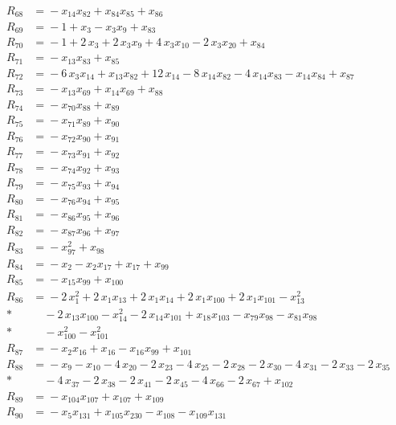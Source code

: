 \begin{align*}
R_{68} &={} -x_{14} x_{82} +x_{84} x_{85} +x_{86} \\[2pt]
R_{69} &={} -1 +x_{3} -x_{3} x_{9} +x_{83} \\[2pt]
R_{70} &={} -1 +2\,x_{3} +2\,x_{3} x_{9} +4\,x_{3} x_{10} -2\,x_{3} x_{20} +x_{84} \\[2pt]
R_{71} &={} -x_{13} x_{83} +x_{85} \\[2pt]
R_{72} &={} -6\,x_{3} x_{14} +x_{13} x_{82} +12\,x_{14} -8\,x_{14} x_{82} -4\,x_{14} x_{83} -x_{14} x_{84} +x_{87} \\[2pt]
R_{73} &={} -x_{13} x_{69} +x_{14} x_{69} +x_{88} \\[2pt]
R_{74} &={} -x_{70} x_{88} +x_{89} \\[2pt]
R_{75} &={} -x_{71} x_{89} +x_{90} \\[2pt]
R_{76} &={} -x_{72} x_{90} +x_{91} \\[2pt]
R_{77} &={} -x_{73} x_{91} +x_{92} \\[2pt]
R_{78} &={} -x_{74} x_{92} +x_{93} \\[2pt]
R_{79} &={} -x_{75} x_{93} +x_{94} \\[2pt]
R_{80} &={} -x_{76} x_{94} +x_{95} \\[2pt]
R_{81} &={} -x_{86} x_{95} +x_{96} \\[2pt]
R_{82} &={} -x_{87} x_{96} +x_{97} \\[2pt]
R_{83} &={} -x_{97}^{2} +x_{98} \\[2pt]
R_{84} &={} -x_{2} -x_{2} x_{17} +x_{17} +x_{99} \\[2pt]
R_{85} &={} -x_{15} x_{99} +x_{100} \\[2pt]
R_{86} &={} -2\,x_{1}^{2} +2\,x_{1} x_{13} +2\,x_{1} x_{14} +2\,x_{1} x_{100} +2\,x_{1} x_{101} -x_{13}^{2} \\*
&\quad{} -2\,x_{13} x_{100} -x_{14}^{2} -2\,x_{14} x_{101} +x_{18} x_{103} -x_{79} x_{98} -x_{81} x_{98} \\*
&\quad{} -x_{100}^{2} -x_{101}^{2} \\[2pt]
R_{87} &={} -x_{2} x_{16} +x_{16} -x_{16} x_{99} +x_{101} \\[2pt]
R_{88} &={} -x_{9} -x_{10} -4\,x_{20} -2\,x_{23} -4\,x_{25} -2\,x_{28} -2\,x_{30} -4\,x_{31} -2\,x_{33} -2\,x_{35} \\*
&\quad{} -4\,x_{37} -2\,x_{38} -2\,x_{41} -2\,x_{45} -4\,x_{66} -2\,x_{67} +x_{102} \\[2pt]
R_{89} &={} -x_{104} x_{107} +x_{107} +x_{109} \\[2pt]
R_{90} &={} -x_{5} x_{131} +x_{105} x_{230} -x_{108} -x_{109} x_{131} \\[2pt]

\end{align*}
